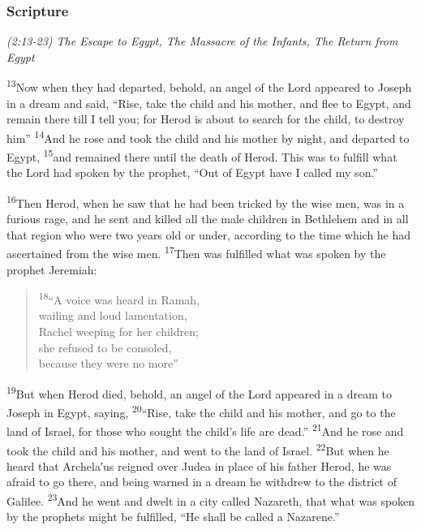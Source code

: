 \documentclass[letterpaper]{report}
\newcommand{\vs}[1]{\textsuperscript{#1}}
\begin{document}
\subsubsection{Scripture}
{\centering
\emph{(2:13-23) The Escape to Egypt,
The Massacre of the Infants,
The Return from Egypt}\\
}
\begin{multicols}{2}
\vs{13}Now when they had departed, behold,
an angel of the Lord appeared to Joseph in a dream and said, ``Rise,
take the child and his mother, and flee to Egypt,
and remain there till I tell you; for Herod is about to search for the child,
to destroy him''
\vs{14}And he rose and took the child and his mother by night,
and departed to Egypt,
\vs{15}and remained there until the death of Herod.
This was to fulfill what the Lord had spoken by the prophet,
``Out of Egypt have I called my son.''

\vs{16}Then Herod, when he saw that he had been tricked by the wise men,
was in a furious rage,
and he sent and killed all the male children in Bethlehem and in all that 
region who were two years old or under,
according to the time which he had ascertained from the wise men.
\vs{17}Then was fulfilled what was spoken by the prophet Jeremiah:

\begin{verse}
\vs{18}``A voice was heard in Ramah,\\
wailing and loud lamentation,\\
Rachel weeping for her children;\\
she refused to be consoled,\\
because they were no more''\\
\end{verse}

\vs{19}But when Herod died, behold,
an angel of the Lord appeared in a dream to Joseph in Egypt, saying,
\vs{20}``Rise, take the child and his mother, and go to the land of Israel,
for those who sought the child’s life are dead.''
\vs{21}And he rose and took the child and his mother,
and went to the land of Israel.
\vs{22}But when he heard that Archela′us reigned over Judea in place of his 
father Herod, he was afraid to go there,
and being warned in a dream he withdrew to the district of Galilee.
\vs{23}And he went and dwelt in a city called Nazareth,
that what was spoken by the prophets might be fulfilled,
``He shall be called a Nazarene.''
\end{multicols}

\clearpage
\end{document}
